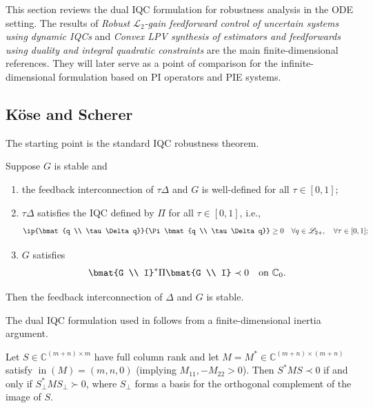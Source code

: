 This section reviews the dual IQC formulation for robustness analysis in the ODE setting. The results of
\textit{Robust $\mathscr{L}_2$-gain feedforward control of uncertain systems using dynamic IQCs} \cite{koserobust}
and \textit{Convex LPV synthesis of estimators and feedforwards using duality and integral quadratic constraints} \cite{venkataraman}
are the main finite-dimensional references. They will later serve as a point of comparison for the infinite-dimensional formulation based on PI operators and PIE systems.

\subsection{Köse and Scherer}
The starting point is the standard IQC robustness theorem.
\begin{theorem}
    Suppose $G$ is stable and
    \begin{enumerate}
        \item the feedback interconnection of $\tau\Delta$ and $G$ is well-defined for all $\tau \in [0,1]$;
        \item $\tau\Delta$ satisfies the IQC defined by $\Pi$ for all $\tau \in [0,1]$, i.e.,
        \begin{equation}\label{iqc}
            \ip{\bmat{q \\ \tau\Delta q}}{\Pi\bmat{q \\ \tau\Delta q}} \geq 0
            \quad \forall q \in \mathscr{L}_{2+}, \quad \forall \tau \in [0,1];
        \end{equation}
        \item $G$ satisfies
        \begin{equation}\label{primal}
            \bmat{G \\ I}^* \Pi \bmat{G \\ I} \prec 0
            \quad \text{on } \mathbb{C}_0.
        \end{equation}
    \end{enumerate}
    Then the feedback interconnection of $\Delta$ and $G$ is stable.
\end{theorem}

The dual IQC formulation used in \cite{koserobust} follows from a finite-dimensional inertia argument.
\begin{lemma}\label{lemma}
    Let $S\in\mathbb{C}^{(m+n)\times m}$ have full column rank and let
    $M = M^* \in \mathbb{C}^{(m+n)\times(m+n)}$ satisfy $\operatorname{in}(M) = (m,n,0)$
    (implying $M_{11},-M_{22}>0$). Then $S^*MS\prec 0$ if and only if
    $S_\perp^* M S_\perp \succ 0$, where $S_\perp$ forms a basis for the orthogonal
    complement of the image of $S$.
\end{lemma}

